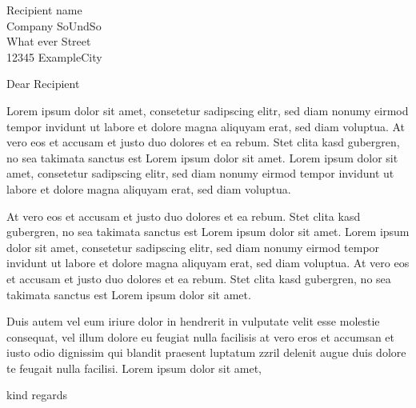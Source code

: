\documentclass[
    sender,
    paper=a4,
    version=last,
    fontsize=11pt,
    DIV=13,
    BCOR=0mm]{scrlttr2}
\begin{document}


\begin{letter}{
    Recipient name \\
    Company SoUndSo\\
    What ever Street\\
    12345 ExampleCity
}
\opening{Dear Recipient}

Lorem ipsum dolor sit amet, consetetur sadipscing elitr, sed diam nonumy eirmod tempor invidunt ut labore et dolore magna aliquyam erat, sed diam voluptua. At vero eos et accusam et justo duo dolores et ea rebum. Stet clita kasd gubergren, no sea takimata sanctus est Lorem ipsum dolor sit amet. Lorem ipsum dolor sit amet, consetetur sadipscing elitr, sed diam nonumy eirmod tempor invidunt ut labore et dolore magna aliquyam erat, sed diam voluptua.

At vero eos et accusam et justo duo dolores et ea rebum. Stet clita kasd gubergren, no sea takimata sanctus est Lorem ipsum dolor sit amet. Lorem ipsum dolor sit amet, consetetur sadipscing elitr, sed diam nonumy eirmod tempor invidunt ut labore et dolore magna aliquyam erat, sed diam voluptua. At vero eos et accusam et justo duo dolores et ea rebum. Stet clita kasd gubergren, no sea takimata sanctus est Lorem ipsum dolor sit amet.

Duis autem vel eum iriure dolor in hendrerit in vulputate velit esse molestie consequat, vel illum dolore eu feugiat nulla facilisis at vero eros et accumsan et iusto odio dignissim qui blandit praesent luptatum zzril delenit augue duis dolore te feugait nulla facilisi. Lorem ipsum dolor sit amet,


\closing{kind regards} %
\end{letter}
\end{document}
